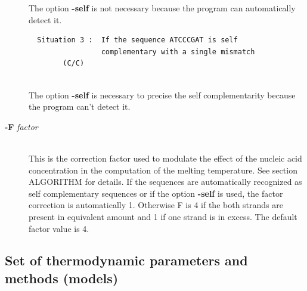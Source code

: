 \documentclass{article}
\begin{document}
\begin{description}
\begin{verbatim}
  \end{verbatim}
    
  The option \textbf{-self} is not necessary because the program 
  can automatically detect it.
  
  \begin{verbatim}  
  Situation 3 :  If the sequence ATCCCGAT is self 
                 complementary with a single mismatch 
		(C/C)
      
  \end{verbatim}
  		 
  The option \textbf{-self} is necessary to precise the self 
  complementarity because the program can't detect it.
      
 \item [\textbf{-F} \textit{factor}  ]\mbox{}\\
  This is the correction factor used to modulate the effect of the nucleic acid concentration in the computation of the melting temperature. 
  See section ALGORITHM for details. If the sequences are automatically recognized as self complementary sequences or if the option \textbf{-self}
  is used, the factor correction is automatically 1. Otherwise F is 4 if the both strands are present in equivalent amount and 1 if one strand is in excess. 
  The default factor value is 4.
\end{description}

\subsection{Set of thermodynamic parameters and methods (models)}
\end{document}
